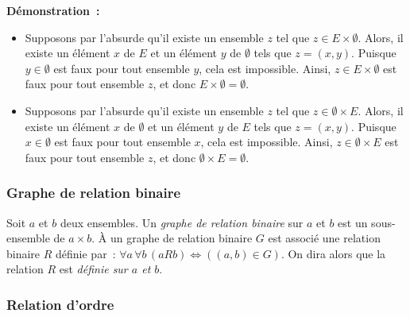\noindent\textbf{Démonstration :} 
\begin{itemize}[nosep]
    \item Supposons par l'absurde qu'il existe un ensemble $z$ tel que $z \in E \times \emptyset$.
        Alors, il existe un élément $x$ de $E$ et un élément $y$ de $\emptyset$ tels que $z = (x,y)$. 
        Puisque $y \in \emptyset$ est faux pour tout ensemble $y$, cela est impossible.
        Ainsi, $z \in E \times \emptyset$ est faux pour tout ensemble $z$, et donc $E \times \emptyset = \emptyset$.
    \item Supposons par l'absurde qu'il existe un ensemble $z$ tel que $z \in \emptyset \times E$.
        Alors, il existe un élément $x$ de $\emptyset$ et un élément $y$ de $E$ tels que $z = (x,y)$. 
        Puisque $x \in \emptyset$ est faux pour tout ensemble $x$, cela est impossible.
        Ainsi, $z \in \emptyset \times E$ est faux pour tout ensemble $z$, et donc $\emptyset \times E = \emptyset$.
\end{itemize}

\done

\subsubsection{Graphe de relation binaire}

Soit $a$ et $b$ deux ensembles. 
Un \textit{graphe de relation binaire} sur $a$ et $b$ est un sous-ensemble de $a \times b$. 
À un graphe de relation binaire $G$ est associé une relation binaire $R$ définie par : $\forall a \, \forall b \, (a R b) \Leftrightarrow ((a,b) \in G)$. 
On dira alors que la relation $R$ est \textit{définie sur $a$ et $b$}.

\subsubsection{Relation d'ordre}


